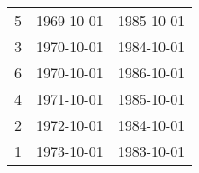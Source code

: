 % 
\begin{tabular}{ccc}
  \hline
  \hline
5 & 1969-10-01 & 1985-10-01 \\ 
  3 & 1970-10-01 & 1984-10-01 \\ 
  6 & 1970-10-01 & 1986-10-01 \\ 
  4 & 1971-10-01 & 1985-10-01 \\ 
  2 & 1972-10-01 & 1984-10-01 \\ 
  1 & 1973-10-01 & 1983-10-01 \\ 
   \hline
\end{tabular}
